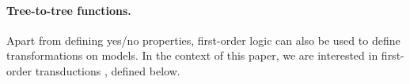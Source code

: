  \paragraph*{Tree-to-tree functions.}
 Apart from defining yes/no properties, first-order logic can also be used  to define transformations on  models. In the context of this paper, we are interested in first-order transductions%
, defined below. 


